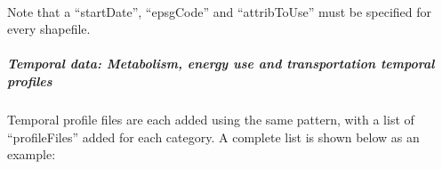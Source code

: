 \documentclass[letterpaper,10pt,english]{sphinxmanual}
\begin{document}
%
\begin{sphinxVerbatim}[commandchars=\\\{\}]
      
      
      
      
      
\end{sphinxVerbatim}

Note that a “startDate”, “epsgCode” and “attribToUse” must be specified
for every shapefile.


\subparagraph{Temporal data: Metabolism, energy use and transportation temporal profiles}
\label{\detokenize{OtherManuals/GQF_Manual:temporal-data-metabolism-energy-use-and-transportation-temporal-profiles}}
Temporal profile files are each added using the same pattern, with a
list of “profileFiles” added for each category. A complete list is shown
below as an example:
\end{document}
